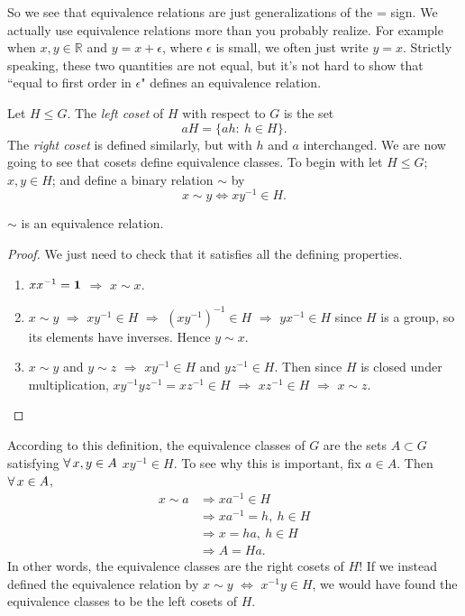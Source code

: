So we see that equivalence relations are just generalizations of the =
sign. We actually use equivalence relations more than you probably realize.
For example when $x,y\in\mathbb{R}$ and $y=x+\epsilon$, where $\epsilon$ is
small, we often just write $y=x$. Strictly speaking, these two quantities
are not equal, but it's not hard to show that ``equal to first order in
$\epsilon$" defines an equivalence relation.

Let $H\le G$. The {\it left coset}  of $H$ with respect to 
$G$ is the set
  $$ aH=\{ah:\ h\in H\}. $$
The {\it right coset} is defined similarly, but with $h$ and $a$
interchanged.
We are now going to see that cosets define equivalence classes. To begin with
let $H\le G$; $x,y\in H$; and define a binary relation $\sim$ by
\begin{equation}
  x\sim y \Leftrightarrow xy^{-1}\in H.
\end{equation}
\begin{proposition}{}{}
  $\sim$ is an equivalence relation.
  \begin{proof}
    We just need to check that it satisfies all the defining properties.
    \begin{enumerate}
      \item $xx^{-1}={\mathbf 1}$ $\Rightarrow$ $x\sim x$.
      \item $x\sim y$ $\Rightarrow$ $xy^{-1}\in H$ $\Rightarrow$
            $(xy^{-1})^{-1}\in H$ $\Rightarrow$ $yx^{-1}\in H$
            since $H$ is a group, so its elements have inverses.
            Hence $y\sim x$.
      \item $x\sim y$ and $y\sim z$ $\Rightarrow$ $xy^{-1}\in H$ and
            $yz^{-1}\in H$. Then since $H$ is closed under multiplication,
            $xy^{-1}yz^{-1}=xz^{-1}\in H$ $\Rightarrow$ $xz^{-1}\in H$ 
            $\Rightarrow$ $x\sim z$.
    \end{enumerate}
  \end{proof}
\end{proposition}
According to this definition, the equivalence classes of $G$ are the sets
$A\subset G$ satisfying $\operatorname{\forall} x,y\in A$ $xy^{-1}\in H$. To see why this is
important, fix $a\in A$. Then $\operatorname{\forall} x\in A$,
\begin{equation}
  \begin{aligned}
    x\sim a &\Rightarrow xa^{-1}\in H \\
            &\Rightarrow xa^{-1}=h,\ h\in H\\
            &\Rightarrow x=ha,\ h\in H\\
            &\Rightarrow A=Ha.
  \end{aligned}
\end{equation}
In other words, the equivalence classes are the right cosets of $H$! If we
instead defined the equivalence relation by $x\sim y$ $\Leftrightarrow$
$x^{-1}y\in H$, we would have found the equivalence classes to be the left
cosets of $H$.

